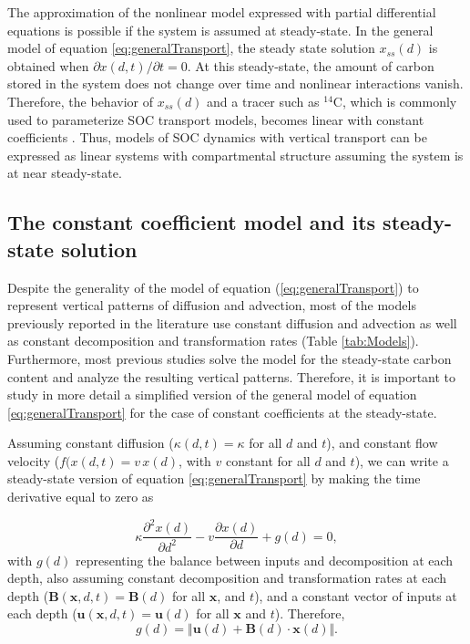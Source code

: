 \documentclass[11pt, oneside, a4paper]{article}   	%
\begin{document}
The approximation of the nonlinear model expressed with partial differential equations is possible if the system is assumed at steady-state. In the general model of equation \ref{eq:generalTransport}, the steady state solution $x_{ss}(d)$ is obtained when $\partial x(d, t)/\partial t =0 $. At this steady-state, the amount of carbon stored in the system does not change over time and nonlinear interactions vanish. Therefore, the behavior of $x_{ss}(d)$ and a tracer such as $^{14}$C, which is commonly used to parameterize SOC transport models, becomes linear with constant coefficients \citep{Anderson1983}. 
Thus, models of SOC dynamics with vertical transport can be expressed as linear systems with compartmental structure assuming the system is at near steady-state. 

\subsection{The constant coefficient model and its steady-state solution}
Despite the generality of the model of equation (\ref{eq:generalTransport}) to represent vertical patterns of diffusion and advection, most of the models previously reported in the literature use constant diffusion and advection as well as  constant decomposition and transformation rates (Table \ref{tab:Models}). Furthermore, most previous studies solve the model for the steady-state carbon content and analyze the resulting vertical patterns. Therefore, it is important to study in more detail a simplified version of the general model of equation \ref{eq:generalTransport} for the case of constant coefficients at the steady-state.

Assuming constant diffusion ($\kappa (d, t) = \kappa$ for all $d$ and $t$), and constant flow velocity ($f(x(d,t) = v \, x(d)$, with $v$ constant for all $d$ and $t$), we can write a steady-state version of equation \ref{eq:generalTransport} by making the time derivative equal to zero as

\begin{equation} \label{eq:linearSecondOrder}
 \kappa \frac{\partial^2 x(d)}{\partial d^2} - v \frac{\partial x(d)}{\partial d} + g(d) =0,
\end{equation}
with $g(d)$ representing the balance between inputs and decomposition at each depth, also assuming constant decomposition and transformation rates at each depth ($\mathbf{B}(\bm{x}, d,t) = \mathbf{B}(d)$ for all $\bm{x}$, and $t$), and a constant vector of inputs at each depth ($\bm{u}(\bm{x}, d, t) = \bm{u}(d)$ for all $\bm{x}$ and $t$). Therefore, 
\begin{equation}
g(d) = \Vert \bm{u}(d) + \mathbf{B}(d) \cdot \bm{x}(d) \Vert .
\end{equation}
\end{document}
